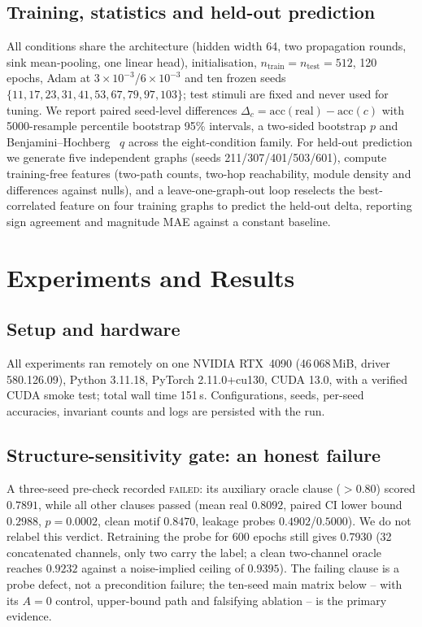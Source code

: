 \documentclass[10pt,twocolumn,letterpaper]{article}
\begin{document}
\subsection{Training, statistics and held-out prediction}
\label{sec:protocol}

All conditions share the architecture (hidden width 64, two propagation
rounds, sink mean-pooling, one linear head), initialisation,
$n_{\text{train}}=n_{\text{test}}=512$, 120 epochs, Adam at
$3\!\times\!10^{-3}$/$6\!\times\!10^{-3}$ and ten frozen seeds
$\{11,17,23,31,41,53,67,79,97,103\}$; test stimuli are fixed and never used
for tuning. We report paired seed-level differences
$\Delta_c=\mathrm{acc}(\text{real})-\mathrm{acc}(c)$ with 5000-resample
percentile bootstrap 95\% intervals, a two-sided bootstrap $p$ and
Benjamini--Hochberg~\cite{benjamini1995} $q$ across the eight-condition
family. For held-out prediction we generate five independent graphs
(seeds 211/307/401/503/601), compute training-free features (two-path counts,
two-hop reachability, module density and differences against nulls), and a
leave-one-graph-out loop reselects the best-correlated feature on four
training graphs to predict the held-out delta, reporting sign agreement and
magnitude MAE against a constant baseline.

\section{Experiments and Results}
\label{sec:exp}

\subsection{Setup and hardware}
\label{sec:setup}

All experiments ran remotely on one NVIDIA RTX~4090 (46\,068\,MiB, driver
580.126.09), Python 3.11.18, PyTorch 2.11.0+cu130, CUDA 13.0, with a verified
CUDA smoke test; total wall time 151\,s. Configurations, seeds, per-seed
accuracies, invariant counts and logs are persisted with the run.

\subsection{Structure-sensitivity gate: an honest failure}
\label{sec:gate}

A three-seed pre-check recorded \textsc{failed}: its auxiliary oracle clause
($>0.80$) scored $0.7891$, while all other clauses passed (mean real
$0.8092$, paired CI lower bound $0.2988$, $p=0.0002$, clean motif $0.8470$,
leakage probes $0.4902$/$0.5000$). We do not relabel this verdict. Retraining
the probe for 600 epochs still gives $0.7930$ (32 concatenated channels, only
two carry the label; a clean two-channel oracle reaches $0.9232$ against a
noise-implied ceiling of $0.9395$). The failing clause is a probe defect, not
a precondition failure; the ten-seed main matrix below -- with its $A=0$
control, upper-bound path and falsifying ablation -- is the primary evidence.
\end{document}
